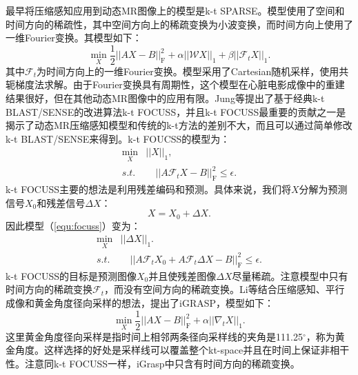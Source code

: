 最早将压缩感知应用到动态MR图像上的模型是k-t SPARSE\cite{lustig2006}。模型使用了空间和时间方向的稀疏性，其中空间方向上的稀疏变换为小波变换，而时间方向上使用了一维Fourier变换。其模型如下：
\begin{equation}
	\min_X\frac{1}{2}||AX-B||_\mathrm{F}^2 + \alpha||\mathcal{W}X||_1 + \beta||\mathcal{F}_tX||_1.
\end{equation}
其中$\mathcal{F}_t$为时间方向上的一维Fourier变换。模型采用了Cartesian随机采样，使用共轭梯度法求解。由于Fourier变换具有周期性，这个模型在心脏电影成像中的重建结果很好，但在其他动态MR图像中的应用有限。Jung等提出了基于经典k-t BLAST/SENSE\cite{Jeffrey2003k}的改进算法k-t FOCUSS\cite{focuss,jung2007improved}，并且k-t FOCUSS最重要的贡献之一是揭示了动态MR压缩感知模型和传统的k-t方法的差别不大，而且可以通过简单修改k-t BLAST/SENSE来得到。k-t FOUCSS的模型为：
\begin{equation}
\begin{aligned}
		\min_X &||X||_1,\\ 
		s.t.&\quad ||A\mathcal{F}_tX-B||_\mathrm{F}^2\leq \epsilon.
\end{aligned}
\label{equ:focuss}
\end{equation}
k-t FOCUSS主要的想法是利用残差编码和预测。具体来说，我们将$X$分解为预测信号$X_0$和残差信号$\Delta X$：
\begin{equation*}
	X=X_0+\Delta X.
\end{equation*}
因此模型（\ref{equ:focuss}）变为：
\begin{equation}
\begin{aligned}
		\min_X &||\Delta X||_1.\\ 
		s.t.&\quad ||A\mathcal{F}_tX_0+A\mathcal{F}_t\Delta X-B||_\mathrm{F}^2\leq \epsilon.
\end{aligned}
\end{equation}
k-t FOCUSS的目标是预测图像$X_0$并且使残差图像$\Delta X$尽量稀疏。注意模型中只有时间方向的稀疏变换$\mathcal{F}_t$，而没有空间方向的稀疏变换。Li等结合压缩感知、平行成像和黄金角度径向采样的想法，提出了iGRASP\cite{igrasp}，模型如下：
\begin{equation}
	\min_X\frac{1}{2}||AX-B||_\mathrm{F}^2+\alpha||\nabla_t X||_1.
\end{equation}
这里黄金角度径向采样是指时间上相邻两条径向采样线的夹角是111.25$^{\circ}$，称为黄金角度。这样选择的好处是采样线可以覆盖整个kt-space并且在时间上保证非相干性。注意同k-t FOCUSS一样，iGrasp中只含有时间方向的稀疏变换。

